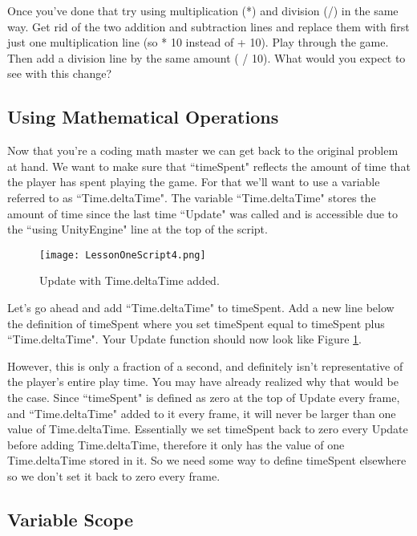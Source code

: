 \documentclass{article}
\begin{document}
Once you've done that try using multiplication (*) and division (/) in the same way. Get rid of the two addition and subtraction lines and replace them with first just one multiplication line (so * 10 instead of + 10). Play through the game. Then add a division line by the same amount ( / 10). What would you expect to see with this change? 

\subsection{Using Mathematical Operations}

Now that you're a coding math master we can get back to the original problem at hand. We want to make sure that ``timeSpent" reflects the amount of time that the player has spent playing the game. For that we'll want to use a variable referred to as ``Time.deltaTime". The variable ``Time.deltaTime" stores the amount of time since the last time ``Update" was called and is accessible due to the ``using UnityEngine" line at the top of the script.

\begin{figure}
  \texttt{[image: LessonOneScript4.png]}
  \caption{Update with Time.deltaTime added.}
  \label{fig:code4}
\end{figure}

Let's go ahead and add ``Time.deltaTime" to timeSpent. Add a new line below the definition of timeSpent where you set timeSpent equal to timeSpent plus ``Time.deltaTime". Your Update function should now look like Figure \ref{fig:code4}.

\noindent{} 
However, this is only a fraction of a second, and definitely isn't representative of the player's entire play time. You may have already realized why that would be the case. Since ``timeSpent" is defined as zero at the top of Update every frame, and ``Time.deltaTime" added to it every frame, it will never be larger than one value of Time.deltaTime. Essentially we set timeSpent back to zero every Update before adding Time.deltaTime, therefore it only has the value of one Time.deltaTime stored in it. So we need some way to define timeSpent elsewhere so we don't set it back to zero every frame. 

\subsection{Variable Scope}
\end{document}
